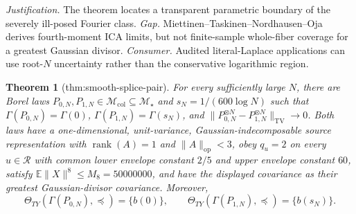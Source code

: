 \documentclass{article}
\newtheorem{theorem}{Theorem}
\begin{document}
\par\smallskip\noindent \textit{Justification.} The theorem locates a transparent parametric boundary of the severely ill-posed Fourier class. \textit{Gap.} Miettinen--Taskinen--Nordhausen--Oja derives fourth-moment ICA limits, but not finite-sample whole-fiber coverage for a greatest Gaussian divisor. \textit{Consumer.} Audited literal-Laplace applications can use root-\(N\) uncertainty rather than the conservative logarithmic region.

\begin{theorem}[thm:smooth-splice-pair]\label{thm:smooth-splice-pair}
For every sufficiently large \(N\), there are Borel laws \(P_{0,N},P_{1,N}\in\mathcal M_{\mathrm{col}}\subseteq\mathcal M_\star\) and \(s_N=1/(600\log N)\) such that \(\Gamma(P_{0,N})=\Gamma(0)\), \(\Gamma(P_{1,N})=\Gamma(s_N)\), and \(\|P_{0,N}^{\otimes N}-P_{1,N}^{\otimes N}\|_{\mathrm{TV}}\to0\).  Both laws have a one-dimensional, unit-variance, Gaussian-indecomposable source representation with \(\operatorname{rank}(A)=1\) and \(\|A\|_{\mathrm{op}}<3\), obey \(q_u=2\) on every \(u\in\mathcal R\) with common lower envelope constant \(2/5\) and upper envelope constant \(60\), satisfy \(\mathbb E\|X\|^8\le M_8=50000000\), and have the displayed covariance as their greatest Gaussian-divisor covariance.  Moreover,
\[
 \Theta_{TY}(\Gamma(P_{0,N}),\preceq)=\{b(0)\},\qquad
 \Theta_{TY}(\Gamma(P_{1,N}),\preceq)=\{b(s_N)\}.
\]
\end{theorem}
\end{document}
